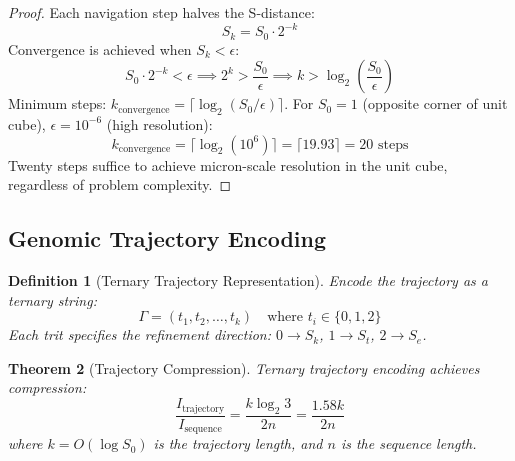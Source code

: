\documentclass[11pt,a4paper]{article}
\newtheorem{theorem}{Theorem}[section]
\newtheorem{definition}[theorem]{Definition}
\theoremstyle{remark}
\newcommand{\Sk}{S_k}
\newcommand{\St}{S_t}
\newcommand{\Se}{S_e}
\begin{document}
\begin{proof}
Each navigation step halves the S-distance:
\begin{equation}
S_k = S_0 \cdot 2^{-k}
\end{equation}
Convergence is achieved when $S_k < \epsilon$:
\begin{equation}
S_0 \cdot 2^{-k} < \epsilon \implies 2^k > \frac{S_0}{\epsilon} \implies k > \log_2\left(\frac{S_0}{\epsilon}\right)
\end{equation}
Minimum steps: $k_{\text{convergence}} = \lceil\log_2(S_0/\epsilon)\rceil$. For $S_0 = 1$ (opposite corner of unit cube), $\epsilon = 10^{-6}$ (high resolution):
\begin{equation}
k_{\text{convergence}} = \lceil\log_2(10^6)\rceil = \lceil 19.93\rceil = 20 \text{ steps}
\end{equation}
Twenty steps suffice to achieve micron-scale resolution in the unit cube, regardless of problem complexity.
\end{proof}

\subsection{Genomic Trajectory Encoding}

\begin{definition}[Ternary Trajectory Representation]
\label{def:ternary_trajectory}
Encode the trajectory as a ternary string:
\begin{equation}
\Gamma = (t_1, t_2, \ldots, t_k) \quad \text{where } t_i \in \{0, 1, 2\}
\end{equation}
Each trit specifies the refinement direction: $0 \to \Sk$, $1 \to \St$, $2 \to \Se$.
\end{definition}

\begin{theorem}[Trajectory Compression]
\label{thm:trajectory_compression}
Ternary trajectory encoding achieves compression:
\begin{equation}
\frac{I_{\text{trajectory}}}{I_{\text{sequence}}} = \frac{k\log_2 3}{2n} = \frac{1.58k}{2n}
\end{equation}
where $k = O(\log S_0)$ is the trajectory length, and $n$ is the sequence length.
\end{theorem}
\end{document}
